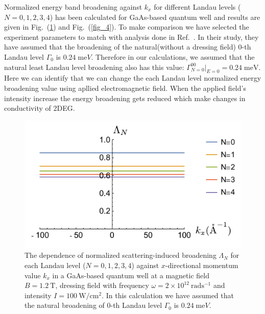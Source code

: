 Normalized energy band broadening against ${k_x}$ for different Landau levels ($N = 0,1,2,3,4$) has been calculated for GaAs-based quantum well and results are given in Fig.~(\ref{fig_3}) and Fig.~(\ref{fig_4}). To make comparison we have selected the experiment parameters to match with analysis done in Ref.~\cite{endo09}. In their study, they have assumed that the broadening of the natural(without a dressing field) $0$-th Landau level $\Gamma_0$ is $0.24\;\text{me}V$. Therefore in our calculations, we assumed that the natural least Landau level broadening also has this value: $\Gamma^{00}_{N=0}|_{E=0} = 0.24 \;\text{meV}$.
Here we can identify that we can change the each Landau level normalized energy broadening value using apllied electromagnetic field. When the applied field's intensity increase the energy broadening gets reduced which make changes in conductivity of 2DEG.
\begin{figure}[t]
\includegraphics[scale=0.9]{figures/fig_3}
\caption{\label{fig_3} The dependence of normalized scattering-induced broadening $\Lambda_N$ for each Landau level ($N =0,1,2,3,4$) against $x$-directional momentum value $k_x$ in a GaAs-based quantum well at a magnetic field $B = 1.2~\text{T}$, dressing field with frequency $\omega =2\times10^{12}~\text{rad}\text{s}^{-1}$ and intensity $I =100~\text{W}/\text{cm}^{2}$. In this calculation we have assumed that the natural  broadening of $0$-th Landau level $\Gamma_0$ is $0.24\;\text{me}V$.}
\end{figure}
